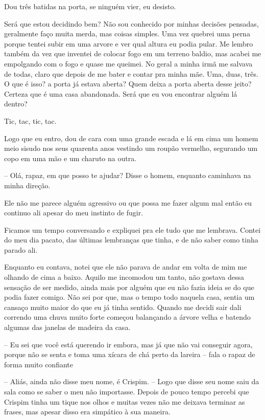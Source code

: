 Dou três batidas na porta, se ninguém vier, eu desisto.

Será que estou decidindo bem? Não sou conhecido por minhas decisões pensadas, geralmente faço muita merda, mas coisas simples. Uma vez quebrei uma perna porque tentei subir em uma arvore e ver qual altura eu podia pular. Me lembro também da vez que inventei de colocar fogo em um terreno baldio, mas acabei me empolgando com o fogo e quase me queimei. No geral a minha irmã me salvava de todas, claro que depois de me bater e contar pra minha mãe.
Uma, duas, três. O que é isso? a porta já estava aberta? Quem deixa a porta aberta desse jeito? Certeza que é uma casa abandonada. Será que eu vou encontrar alguém lá dentro?

Tic, tac, tic, tac.

Logo que eu entro, dou de cara com uma grande escada e lá em cima um homem meio sisudo nos seus quarenta anos vestindo um roupão vermelho, segurando um copo em uma mão e um charuto na outra.

-- Olá, rapaz, em que posso te ajudar? Disse o homem, enquanto caminhava na minha direção.

Ele não me parece alguém agressivo ou que possa me fazer algum mal então eu continuo ali apesar do meu instinto de fugir.

Ficamos um tempo conversando e expliquei pra ele tudo que me lembrava. Contei do meu dia pacato, das últimas lembranças que tinha, e de não saber como tinha parado ali.

Enquanto eu contava, notei que ele não parava de andar em volta de mim me olhando de cima a baixo. Aquilo me incomodou um tanto, não gostava dessa sensação de ser medido, ainda mais por alguém que eu não fazia ideia se do que podia fazer comigo. Não sei por que, mas o tempo todo naquela casa, sentia um cansaço muito maior do que eu já tinha sentido. Quando me decidi sair dali correndo uma chuva muito forte começou balançando a árvore velha e batendo algumas das janelas de madeira da casa.

-- Eu sei que você está querendo ir embora, mas já que não vai conseguir agora, porque não se senta e toma uma xícara de chá perto da lareira -- fala o rapaz de forma muito confiante 

-- Aliás, ainda não disse meu nome, é Crispim. -- Logo que disse seu nome saiu da sala como se saber o meu não importasse.
Depois de pouco tempo percebi que Crispim tinha um tique nos olhos e muitas vezes não me deixava terminar as frases, mas apesar disso era simpático à sua maneira.

